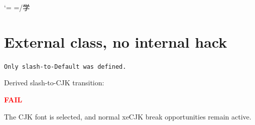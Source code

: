 \documentclass{article}
\newif\ifDerivedTransitionSeen
\begin{document}
\begingroup
  \XeTeXcharclass`\/=\urlBreakClass
  =\hbox{/学}%
\endgroup

\section*{External class, no internal hack}
\texttt{Only slash-to-Default was defined.}

\medskip
\noindent
Derived slash-to-CJK transition:
\ifDerivedTransitionSeen
  \textcolor{green!50!black}{\bfseries PASS}
\else
  \textcolor{red}{\bfseries FAIL}
\fi

\nocite{Gakushyu}
\printbibliography[heading=none]

\smallskip
\noindent
The CJK font is selected, and normal xeCJK break opportunities remain active.
\end{document}
